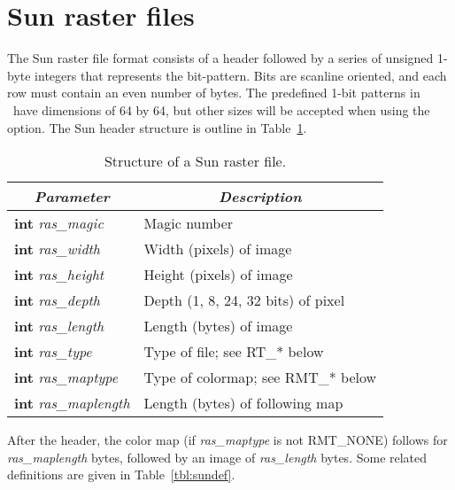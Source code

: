 \section{Sun raster files}

The Sun raster file format consists of a header followed by a series
of unsigned 1-byte integers that represents the bit-pattern.  Bits
are scanline oriented, and each row must contain an even number of
bytes.  The predefined 1-bit
patterns in \GMT\ have dimensions of 64 by 64, but other sizes will be
accepted when using the  option.  The Sun header structure
is outline in Table~\ref{tbl:sunheader}.

\begin{table}[H]
\centering

\begin{tabular}{|l|l|}  \hline
\multicolumn{1}{|c}{\emph{Parameter}}   &       \multicolumn{1}{|c|}{\emph{Description}}        \\ \hline
\textbf{int} \emph{ras\_magic}      &       Magic number  \\ \hline
\textbf{int} \emph{ras\_width}      &       Width (pixels) of image  \\ \hline
\textbf{int} \emph{ras\_height}     &       Height (pixels) of image  \\ \hline
\textbf{int} \emph{ras\_depth}      &       Depth (1, 8, 24, 32 bits) of pixel  \\ \hline
\textbf{int} \emph{ras\_length}     &       Length (bytes) of image  \\ \hline
\textbf{int} \emph{ras\_type}       &       Type of file; see RT\_* below  \\ \hline
\textbf{int} \emph{ras\_maptype}    &       Type of colormap; see RMT\_* below  \\ \hline
\textbf{int} \emph{ras\_maplength}  &       Length (bytes) of following map  \\ \hline
\end{tabular}

\caption{Structure of a Sun raster file.}
\label{tbl:sunheader}
\end{table} 

After the header, the color map (if \emph{ras\_maptype} is not RMT\_NONE)
follows for \emph{ras\_maplength} bytes, followed by an image of
\emph{ras\_length} bytes.  Some related definitions are given in Table~\ref{tbl:sundef}.  

